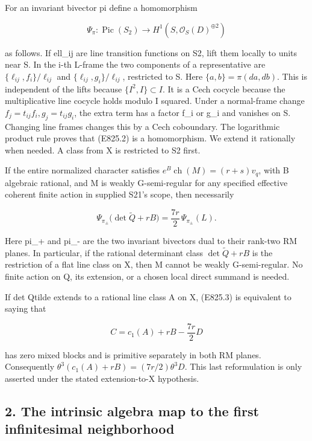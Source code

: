 For an invariant bivector pi define a homomorphism

\[
 \Psi_\pi:\operatorname{Pic}(S_2)\longrightarrow
 H^1(S,\mathcal O_S(D)^{\oplus2})
 \tag{E825.2}
\]

as follows. If ell\_ij are line transition functions on S2, lift them
locally to units near S. In the i-th L-frame the two components of a
representative are \(\{\ell_{ij},f_i\}/\ell_{ij}\) and
\(\{\ell_{ij},g_i\}/\ell_{ij}\), restricted to S. Here
\(\{a,b\}=\pi(da,db)\). This is independent of the lifts because
\(\{I^2,I\}\subset I\). It is a Cech cocycle because the multiplicative
line cocycle holds modulo I squared. Under a normal-frame change
\(f_j=t_{ij}f_i,g_j=t_{ij}g_i\), the extra term has a factor f\_i or
g\_i and vanishes on S. Changing line frames changes this by a Cech
coboundary. The logarithmic product rule proves that (E825.2) is a
homomorphism. We extend it rationally when needed. A class from X is
restricted to S2 first.

If the entire normalized character satisfies
\(e^B\operatorname{ch}(M)=(r+s)v_q\), with B algebraic rational, and M
is weakly G-semi-regular for any specified effective coherent finite
action in supplied S21's scope, then necessarily

\[
 \boxed{\quad
 \Psi_{\pi_\pm}\bigl(\det\widetilde Q+rB\bigr)
       =\frac{7r}{2}\,\Psi_{\pi_\pm}(L).
 \quad}
 \tag{E825.3}
\]

Here pi\_+ and pi\_- are the two invariant bivectors dual to their
rank-two RM planes. In particular, if the rational determinant class
\(\det\widetilde Q+rB\) is the restriction of a flat line class on X,
then M cannot be weakly G-semi-regular. No finite action on Q, its
extension, or a chosen local direct summand is needed.

If det Qtilde extends to a rational line class A on X, (E825.3) is
equivalent to saying that

\[
 C=c_1(A)+rB-\frac{7r}{2}D
 \tag{E825.4}
\]

has zero mixed blocks and is primitive separately in both RM planes.
Consequently \(\theta^3(c_1(A)+rB)=(7r/2)\theta^3D\). This last
reformulation is only asserted under the stated extension-to-X
hypothesis.

\subsection{2. The intrinsic algebra map to the first infinitesimal
neighborhood}\label{SF-E825:the-intrinsic-algebra-map-to-the-first-infinitesimal-neighborhood}

